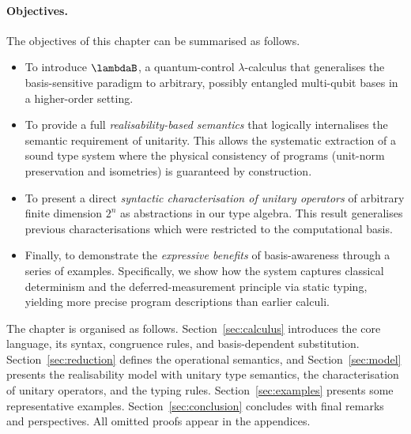 \paragraph*{Objectives.}
The objectives of this chapter can be summarised as follows.
\begin{itemize}[nosep]
  \item To introduce $\lambdaB$, a quantum-control $\lambda$-calculus that 
  generalises the basis-sensitive paradigm to arbitrary, possibly entangled 
  multi-qubit bases in a higher-order setting.
  \item To provide a full \emph{realisability-based semantics} that 
  logically internalises the semantic requirement of unitarity. This allows 
  the systematic extraction of a sound type system where the physical consistency 
  of programs (unit-norm preservation and isometries) is guaranteed by 
  construction.
  \item To present a direct \emph{syntactic characterisation of unitary operators} 
  of arbitrary finite dimension $2^n$ as abstractions in our type algebra. 
  This result generalises previous characterisations which were restricted 
  to the computational basis.
  \item Finally, to demonstrate the \emph{expressive benefits} of basis-awareness 
  through a series of examples. Specifically, we show how the system captures 
  classical determinism and the deferred-measurement principle via static 
  typing, yielding more precise program descriptions than earlier calculi.
\end{itemize}

The chapter is organised as follows.  
Section~\ref{sec:calculus} introduces the core language, its syntax, congruence rules,
and basis-dependent substitution.  
Section~\ref{sec:reduction} defines the operational semantics, and
Section~\ref{sec:model} presents the realisability model with unitary type semantics,
the characterisation of unitary operators, and the typing rules.  
Section~\ref{sec:examples} presents some representative examples.
Section~\ref{sec:conclusion} concludes with final remarks and perspectives.
All omitted proofs appear in the appendices.